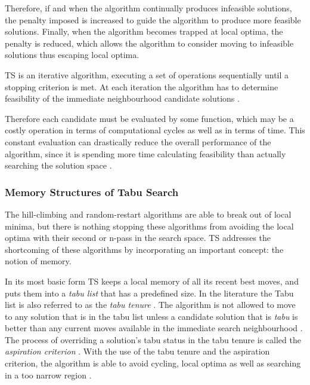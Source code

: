 Therefore, if and when the algorithm continually produces infeasible solutions, the penalty imposed is increased to guide the algorithm to produce more feasible solutions. Finally, when the algorithm becomes trapped at local optima, the penalty is reduced, which allows the algorithm to consider moving to infeasible solutions thus escaping local optima.

TS is an iterative algorithm, executing a set of operations sequentially until a stopping criterion is met\cite{EvoParallelTabu,TabuVechicleRoutingWithTimeWindows}. At each iteration the algorithm has to determine feasibility of the immediate neighbourhood candidate solutions \cite{EvoParallelTabu,TabuVechicleRoutingWithTimeWindows}. 

Therefore each candidate must be evaluated by some function, which may be a costly operation in terms of computational cycles as well as in terms of time\cite{EvoParallelTabu,TabuVechicleRoutingWithTimeWindows}. This constant evaluation can drastically reduce the overall performance of the algorithm, since it is spending more time calculating feasibility than actually searching the solution space \cite{EvoParallelTabu,TabuVechicleRoutingWithTimeWindows}. 

\subsubsection{Memory Structures of Tabu Search}
The hill-climbing and random-restart algorithms are able to break out of local minima, but there is nothing stopping these algorithms from avoiding the local optima with their second or n-pass in the search space. \gls{TS} addresses the shortcoming of these algorithms by incorporating an important concept: the notion of memory.

In its most basic form \gls{TS} keeps a local memory of all its recent best moves, and puts them into a \emph{tabu list} that has a predefined size. In the literature the Tabu list is also referred to as the \emph{tabu tenure} \cite{TSHazardous,TabuCarryOver}. The algorithm is not allowed to move to any solution that is in the tabu list unless a candidate solution that is \emph{tabu} is better than any current moves available in the immediate search neighbourhood \cite{TabuCarryOver,ReactiveTabuVHR}. The process of overriding a solution's tabu status in the tabu tenure is called the \emph{aspiration criterion} \cite{TSHazardous,TabuCarryOver}. With the use of the tabu tenure and the aspiration criterion, the algorithm is able to avoid cycling, local optima as well as searching in a too narrow region \cite{TabuSingleMachineScheduling,CircuitTabu}.

